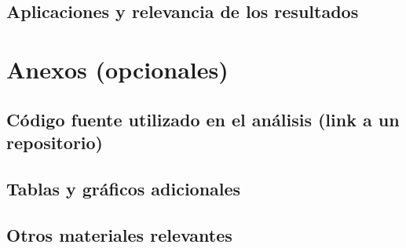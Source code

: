 \documentclass[a4paper]{report}
\begin{document}
\section{Aplicaciones y relevancia de los resultados}


\printbibliography[heading=bibnumbered]



\chapter{Anexos (opcionales)}
\section{Código fuente utilizado en el análisis (link a un repositorio)}
\section{Tablas y gráficos adicionales}
\section{Otros materiales relevantes}
\end{document}
